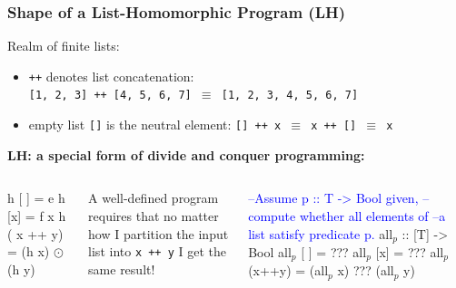 \documentclass{beamer}
\newcommand{\blue}[1]{\textcolor{Blue}{{#1}}}
\newcommand{\emp}[1]{\textcolor{DikuRed}{ #1}}
\newcommand{\mymath}[1]{$ #1 $}
\newcommand{\myindx}[1]{_{#1}}
\begin{document}
\begin{frame}[fragile,t]
\frametitle{Shape of a List-Homomorphic Program (LH)}

Realm of finite lists:
\begin{itemize}
    \item {\tt ++} denotes list concatenation:\\
    {\tt [1, 2, 3] ++ [4, 5, 6, 7] $\equiv$ [1, 2, 3, 4, 5, 6, 7]}
    \item empty list {\tt []} is the neutral element:
        {\tt [] ++ x $\equiv$ x ++ [] $\equiv$ x}
\end{itemize}
\bigskip

\emp{\bf LH: a special form of divide and conquer programming:}
\begin{columns}
\begin{colorcode}[fontsize=\small]
h [ ]   = e
h [x]   = f x
h ( x ++ y) = (h x) \mymath{\odot} (h y)
\end{colorcode}
\alert{A well-defined program requires that no matter how 
I partition the input list into {\tt x ++ y} I get the same result!}
\begin{colorcode}[fontsize=\small]
\blue{--Assume p :: T -> Bool given,}
\blue{--compute whether all elements of}
\blue{--a list satisfy predicate p.}
all\mymath{\myindx{p}} :: [T] -> Bool
all\mymath{\myindx{p}} [ ]  = \alert{???}
all\mymath{\myindx{p}} [x]  = \alert{???} 
all\mymath{\myindx{p}} (x++y) = (all\mymath{\myindx{p}} x) \alert{???} (all\mymath{\myindx{p}} y)
\end{colorcode}
\end{columns}

\end{frame}
\end{document}
